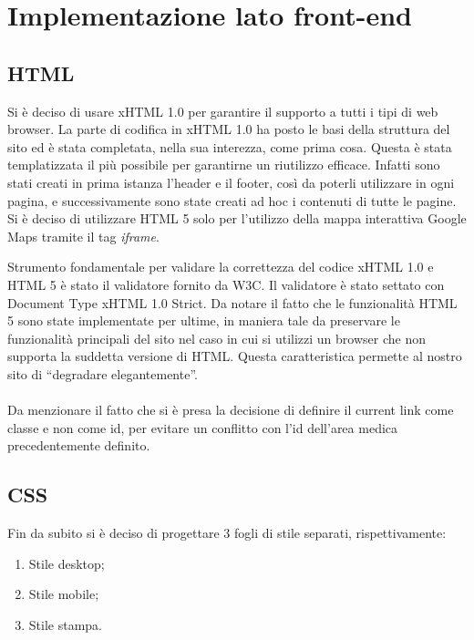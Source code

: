 \section{Implementazione lato front-end}
\label{frontend}

\subsection{HTML}
Si è deciso di usare xHTML 1.0 per garantire il supporto a tutti i tipi di web browser.
La parte di codifica in xHTML 1.0 ha posto le basi della struttura del sito ed è stata completata, nella sua interezza, come prima cosa.
Questa è stata templatizzata il più possibile per garantirne un riutilizzo efficace. Infatti sono stati creati in prima istanza l’header e il footer, così da poterli utilizzare in ogni pagina, e successivamente sono state creati ad hoc i contenuti di tutte le pagine.
Si è deciso di utilizzare HTML 5 solo per l'utilizzo della mappa interattiva Google Maps tramite il tag \textit{iframe}.


Strumento fondamentale per validare la correttezza del codice xHTML 1.0 e HTML 5 è stato il validatore fornito da W3C. Il validatore è stato settato con Document Type xHTML 1.0 Strict.
Da notare il fatto che le funzionalità HTML 5 sono state implementate per ultime, in maniera tale da preservare le funzionalità principali del sito nel caso in cui si utilizzi un browser che non supporta la suddetta versione di HTML. Questa caratteristica permette al nostro sito di “degradare elegantemente”.
\\
\\
Da menzionare il fatto che si è presa la decisione di definire il current link come classe e non come id, per evitare un conflitto con l’id dell’area medica precedentemente definito.

\subsection{CSS}
Fin da subito si è deciso di progettare 3 fogli di stile separati, rispettivamente: 
\begin{enumerate}
\item Stile desktop;
\item Stile mobile;
\item Stile stampa.
\end{enumerate}

